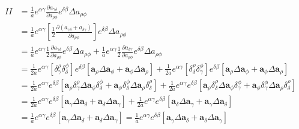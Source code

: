 \begin{equation}\label{eq:del_a_ab_5}
    \begin{split}
        II &= \frac{1}{a} e^{\alpha \gamma} \frac{\partial a_{\gamma \delta}}{\partial a_{\rho \phi}} e^{\delta \beta} \Delta a_{\rho \phi}\\
        &= \frac{1}{a} e^{\alpha \gamma} \left[\frac{1}{2} \frac{\partial \left( a_{\gamma \delta}+ a_{\delta \gamma} \right)}{\partial a_{\rho \phi}}\right] e^{\delta \beta} \Delta a_{\rho \phi}\\    
        &= \frac{1}{a} e^{\alpha \gamma} \frac{1}{2} \frac{\partial a_{\gamma \delta}}{\partial a_{\rho \phi}} e^{\delta \beta} \Delta a_{\rho \phi} + \frac{1}{a} e^{\alpha \gamma} \frac{1}{2} \frac{\partial a_{\delta \gamma}}{\partial a_{\rho \phi}} e^{\delta \beta} \Delta a_{\rho \phi} \\
        &= \frac{1}{2a} e^{\alpha \gamma} \left[ \delta^{\rho}_{\gamma} \delta^{\phi}_{\delta} \right] e^{\delta \beta} \left[ \boldsymbol{a}_{\rho} \Delta \boldsymbol{a}_{\phi} + \boldsymbol{a}_{\phi} \Delta \boldsymbol{a}_{\rho} \right] + \frac{1}{2a} e^{\alpha \gamma} \left[ \delta^{\rho}_{\delta} \delta^{\phi}_{\gamma} \right] e^{\delta \beta} \left[ \boldsymbol{a}_{\rho} \Delta \boldsymbol{a}_{\phi} + \boldsymbol{a}_{\phi} \Delta \boldsymbol{a}_{\rho} \right] \\
        &= \frac{1}{2a} e^{\alpha \gamma} e^{\delta \beta} \left[ \boldsymbol{a}_{\rho} \delta^{\rho}_{\gamma} \Delta \boldsymbol{a}_{\phi} \delta^{\phi}_{\delta} + \boldsymbol{a}_{\phi} \delta^{\phi}_{\delta} \Delta \boldsymbol{a}_{\rho} \delta^{\rho}_{\delta} \right] + \frac{1}{2a} e^{\alpha \gamma} e^{\delta \beta} \left[ \boldsymbol{a}_{\rho} \delta^{\rho}_{\delta} \Delta \boldsymbol{a}_{\phi} \delta^{\phi}_{\gamma} + \boldsymbol{a}_{\phi} \delta^{\phi}_{\gamma} \Delta \boldsymbol{a}_{\rho} \delta^{\rho}_{\delta} \right] \\
        &= \frac{1}{2a} e^{\alpha \gamma} e^{\delta \beta} \left[ \boldsymbol{a}_{\gamma} \Delta \boldsymbol{a}_{\delta} + \boldsymbol{a}_{\delta} \Delta \boldsymbol{a}_{\gamma} \right] + \frac{1}{2a} e^{\alpha \gamma} e^{\delta \beta} \left[ \boldsymbol{a}_{\delta} \Delta \boldsymbol{a}_{\gamma} + \boldsymbol{a}_{\gamma} \Delta \boldsymbol{a}_{\delta} \right] \\
        &= \frac{1}{a} e^{\alpha \gamma} e^{\delta \beta} \left[ \boldsymbol{a}_{\gamma} \Delta \boldsymbol{a}_{\delta} + \boldsymbol{a}_{\delta} \Delta \boldsymbol{a}_{\gamma} \right] = \frac{1}{a} e^{\alpha \gamma} e^{\delta \beta} \left[ \boldsymbol{a}_{\gamma} \Delta \boldsymbol{a}_{\delta} + \boldsymbol{a}_{\delta} \Delta \boldsymbol{a}_{\gamma} \right] \\

\end{split}
\end{equation}
